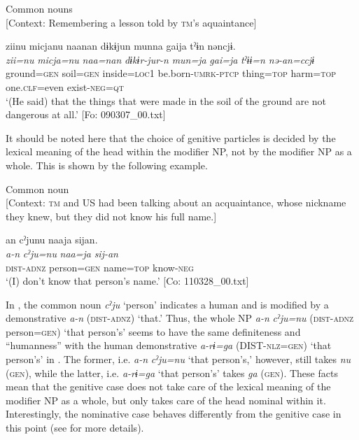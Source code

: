 \ex Common nouns\\{}
[Context: Remembering a lesson told by \textsc{tm}’s aquaintance]

{\TM}
\glll ziinu  micjanu  naanan  dɨkɨjun  munna      gaija  tˀɨn  nəncjɨ.\\
      \textit{zii=nu}  \textit{micja=nu}  \textit{naa=nan}  \textit{dɨkɨr-jur-n}  \textit{mun=ja}      \textit{gai=ja}  \textit{tˀɨɨ=n}  \textit{nə-an=ccjɨ}\\
      ground=\textsc{gen}  soil=\textsc{gen}  inside=\textsc{loc1}  be.born-\textsc{umrk}-\textsc{ptcp}  thing=\textsc{top}      harm=\textsc{top}  one.\textsc{clf}=even  exist-\textsc{neg}=\textsc{qt}\\
\glt ‘(He said) that the things that were made in the soil of the ground are not dangerous at all.’ [Fo: 090307\_00.txt]
\z

It should be noted here that the choice of genitive particles is decided by the lexical meaning of the head within the modifier NP, not by the modifier NP as a whole. This is shown by the following example.

\ea\label{ex:6-109}
  Common noun\\{}
  [Context: \textsc{tm} and US had been talking about an acquaintance, whose nickname they knew, but they did not know his full name.]

{\TM}
\glll an  cˀjunu  naaja  sijan.\\
\textit{a-n}  \textit{cˀju=nu}  \textit{naa=ja}  \textit{sij-an}\\
    \textsc{dist}-\textsc{adnz}  person=\textsc{gen}  name=\textsc{top}  know-\textsc{neg}\\
\glt    ‘(I) don’t know that person’s name.’ [Co: 110328\_00.txt]
\z

In , the common noun \textit{cˀju} ‘person’ indicates a human and is modified by a demonstrative \textit{a-n} (\textsc{dist}-\textsc{adnz}) ‘that.’ Thus, the whole NP \textit{a-n} \textit{cˀju=nu} (\textsc{dist}-\textsc{adnz} person=\textsc{gen}) ‘that person’s’ seems to have the same definiteness and “humanness” with the human demonstrative \textit{a-rɨ=ga} (DIST-\textsc{nlz}=\textsc{gen}) ‘that person’s’ in . The former, i.e. \textit{a-n} \textit{cˀju=nu} ‘that person’s,’ however, still takes \textit{nu} (\textsc{gen}), while the latter, i.e. \textit{a-rɨ=ga} ‘that person’s’ takes \textit{ga} (\textsc{gen}). These facts mean that the genitive case does not take care of the lexical meaning of the modifier NP as a whole, but only takes care of the head nominal within it. Interestingly, the nominative case behaves differently from the genitive case in this point (see  for more details).

